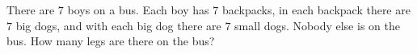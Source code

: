 There are $7$ boys on a bus. Each boy has $7$ backpacks, in each backpack there are $7$ big dogs, and with each big dog there are $7$ small dogs. Nobody else is on the bus. How many legs are there on the bus?
